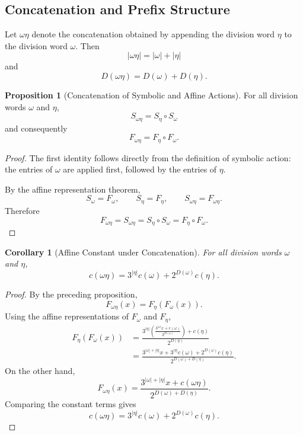 \documentclass[12pt, oneside]{article}
\numberwithin{equation}{section}
\theoremstyle{definition}
\newtheorem{proposition}{Proposition}[section]
\theoremstyle{plain}
\newtheorem{corollary}[theorem]{Corollary}
\theoremstyle{remark}
\begin{document}
\subsection{Concatenation and Prefix Structure}

Let \(\omega\eta\) denote the concatenation obtained by appending the
division word \(\eta\) to the division word \(\omega\). Then
\[
|\omega\eta|=|\omega|+|\eta|
\]
and
\[
D(\omega\eta)=D(\omega)+D(\eta).
\]

\begin{proposition}[Concatenation of Symbolic and Affine Actions]
For all division words \(\omega\) and \(\eta\),
\[
S_{\omega\eta}
=
S_\eta\circ S_\omega
\]
and consequently
\[
F_{\omega\eta}
=
F_\eta\circ F_\omega.
\]
\end{proposition}

\begin{proof}
The first identity follows directly from the definition of symbolic action:
the entries of \(\omega\) are applied first, followed by the entries of
\(\eta\).

By the affine representation theorem,
\[
S_\omega=F_\omega,
\qquad
S_\eta=F_\eta,
\qquad
S_{\omega\eta}=F_{\omega\eta}.
\]
Therefore
\[
F_{\omega\eta}
=
S_{\omega\eta}
=
S_\eta\circ S_\omega
=
F_\eta\circ F_\omega.
\]
\end{proof}

\begin{corollary}[Affine Constant under Concatenation]
For all division words \(\omega\) and \(\eta\),
\[
c(\omega\eta)
=
3^{|\eta|}c(\omega)
+
2^{D(\omega)}c(\eta).
\]
\end{corollary}

\begin{proof}
By the preceding proposition,
\[
F_{\omega\eta}(x)=F_\eta(F_\omega(x)).
\]
Using the affine representations of \(F_\omega\) and \(F_\eta\),
\[
\begin{aligned}
F_\eta(F_\omega(x))
&=
\frac{
3^{|\eta|}
\left(
\frac{3^{|\omega|}x+c(\omega)}
     {2^{D(\omega)}}
\right)
+c(\eta)}
{2^{D(\eta)}}\\
&=
\frac{
3^{|\omega|+|\eta|}x
+
3^{|\eta|}c(\omega)
+
2^{D(\omega)}c(\eta)}
{2^{D(\omega)+D(\eta)}}.
\end{aligned}
\]
On the other hand,
\[
F_{\omega\eta}(x)
=
\frac{
3^{|\omega|+|\eta|}x+c(\omega\eta)}
{2^{D(\omega)+D(\eta)}}.
\]
Comparing the constant terms gives
\[
c(\omega\eta)
=
3^{|\eta|}c(\omega)
+
2^{D(\omega)}c(\eta).
\]
\end{proof}
\end{document}

